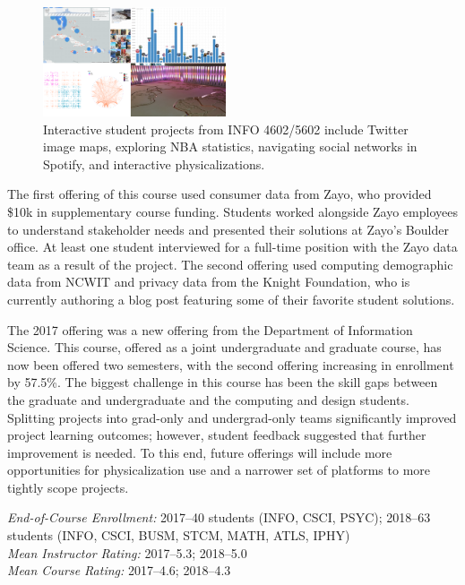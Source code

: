 \documentclass[11pt]{article}
\begin{document}
\begin{figure}
	\begin{center}
		\includegraphics[width=0.48\textwidth]{FlyerImage}
	\end{center}
	\caption{Interactive student projects from INFO 4602/5602 include Twitter image maps, exploring NBA statistics, navigating social networks in Spotify, and interactive physicalizations.}
\end{figure}

The first offering of this course used consumer data from Zayo, who provided \$10k in supplementary course funding. Students worked alongside Zayo employees to understand stakeholder needs and presented their solutions at Zayo's Boulder office. At least one student interviewed for a full-time position with the Zayo data team as a result of the project. The second offering used computing demographic data from NCWIT and privacy data from the Knight Foundation, who is currently authoring a blog post featuring some of their favorite student solutions. 

The 2017 offering was a new offering from the Department of Information Science. 
This course, offered as a joint undergraduate and graduate course, has now been offered two semesters, with the second offering increasing in enrollment by 57.5\%. The biggest challenge in this course has been the skill gaps between the graduate and undergraduate and the computing and design students. Splitting projects into grad-only and undergrad-only teams significantly improved project learning outcomes; however, student feedback suggested that further improvement is needed. To this end, future offerings will include more opportunities for physicalization use and a narrower set of platforms to more tightly scope projects.

\emph{End-of-Course Enrollment: }2017--40 students (INFO, CSCI, PSYC); 2018--63 students (INFO, CSCI, BUSM, STCM, MATH, ATLS, IPHY)\\
\emph{Mean Instructor Rating:} 2017--5.3; 2018--5.0\\
\emph{Mean Course Rating:} 2017--4.6; 2018--4.3
\end{document}
